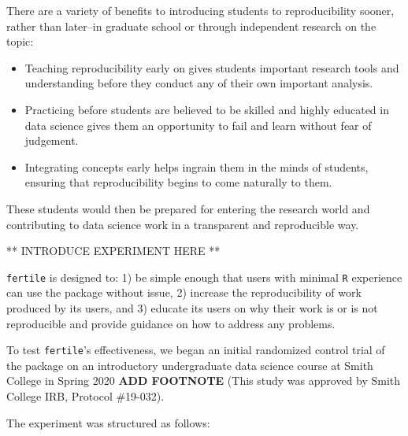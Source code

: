 \documentclass[12pt,twoside]{reedthesis}
\begin{document}
There are a variety of benefits to introducing students to
reproducibility sooner, rather than later--in graduate school or through
independent research on the topic:
\begin{itemize}
\item
  Teaching reproducibility early on gives students important research
  tools and understanding before they conduct any of their own important
  analysis.
\item
  Practicing before students are believed to be skilled and highly
  educated in data science gives them an opportunity to fail and learn
  without fear of judgement.
\item
  Integrating concepts early helps ingrain them in the minds of
  students, ensuring that reproducibility begins to come naturally to
  them.
\end{itemize}
These students would then be prepared for entering the research world
and contributing to data science work in a transparent and reproducible
way.

** INTRODUCE EXPERIMENT HERE **

\texttt{fertile} is designed to: 1) be simple enough that users with
minimal \texttt{R} experience can use the package without issue, 2)
increase the reproducibility of work produced by its users, and 3)
educate its users on why their work is or is not reproducible and
provide guidance on how to address any problems.

To test \texttt{fertile}'s effectiveness, we began an initial randomized
control trial of the package on an introductory undergraduate data
science course at Smith College in Spring 2020 \textbf{ADD FOOTNOTE}
(This study was approved by Smith College IRB, Protocol \#19-032).

The experiment was structured as follows:
\end{document}
